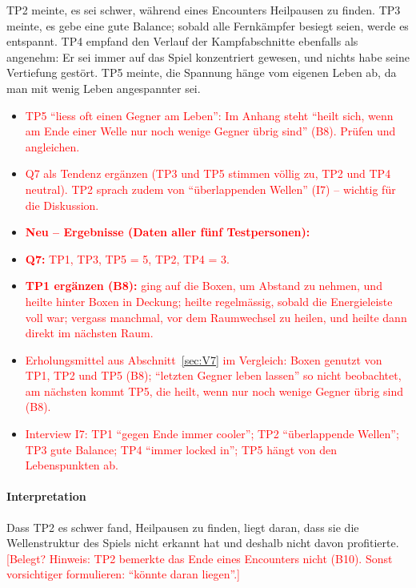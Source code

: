 \documentclass[../Main.tex]{subfiles}
\begin{document}
TP2 meinte, es sei schwer, während eines Encounters Heilpausen zu finden. TP3 meinte, es gebe eine gute Balance; sobald alle Fernkämpfer besiegt seien, werde es entspannt. TP4 empfand den Verlauf der Kampfabschnitte ebenfalls als angenehm: Er sei immer auf das Spiel konzentriert gewesen, und nichts habe seine Vertiefung gestört. TP5 meinte, die Spannung hänge vom eigenen Leben ab, da man mit wenig Leben angespannter sei.

\begin{itemize}[leftmargin=1.5cm]
    \item \textcolor{red}{TP5 \enquote{liess oft einen Gegner am Leben}: Im Anhang steht \enquote{heilt sich, wenn am Ende einer Welle nur noch wenige Gegner übrig sind} (B8). Prüfen und angleichen.}
    \item \textcolor{red}{Q7 als Tendenz ergänzen (TP3 und TP5 stimmen völlig zu, TP2 und TP4 neutral). TP2 sprach zudem von \enquote{überlappenden Wellen} (I7) -- wichtig für die Diskussion.}
\end{itemize}

\begin{itemize}[leftmargin=1.5cm]
    \item \textcolor{red}{\textbf{Neu -- Ergebnisse (Daten aller fünf Testpersonen):}}
    \item \textcolor{red}{\textbf{Q7:} TP1, TP3, TP5 = 5, TP2, TP4 = 3.}
    \item \textcolor{red}{\textbf{TP1 ergänzen (B8):} ging auf die Boxen, um Abstand zu nehmen, und heilte hinter Boxen in Deckung; heilte regelmässig, sobald die Energieleiste voll war; vergass manchmal, vor dem Raumwechsel zu heilen, und heilte dann direkt im nächsten Raum.}
    \item \textcolor{red}{Erholungsmittel aus Abschnitt~\ref{sec:V7} im Vergleich: Boxen genutzt von TP1, TP2 und TP5 (B8); \enquote{letzten Gegner leben lassen} so nicht beobachtet, am nächsten kommt TP5, die heilt, wenn nur noch wenige Gegner übrig sind (B8).}
    \item \textcolor{red}{Interview I7: TP1 \enquote{gegen Ende immer cooler}; TP2 \enquote{überlappende Wellen}; TP3 gute Balance; TP4 \enquote{immer locked in}; TP5 hängt von den Lebenspunkten ab.}
\end{itemize}

\paragraph{Interpretation}
Dass TP2 es schwer fand, Heilpausen zu finden, liegt daran, dass sie die Wellenstruktur des Spiels nicht erkannt hat und deshalb nicht davon profitierte. \textcolor{red}{[Belegt? Hinweis: TP2 bemerkte das Ende eines Encounters nicht (B10). Sonst vorsichtiger formulieren: \enquote{könnte daran liegen}.]}
\end{document}
